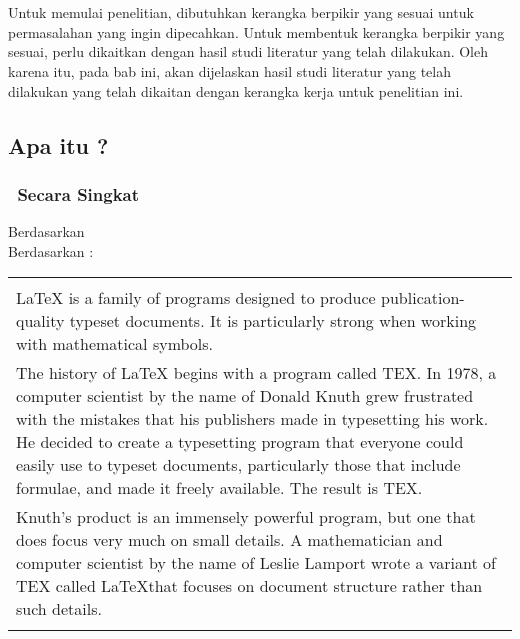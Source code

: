 \chapter{\babDua}
\label{bab:2}
Untuk memulai penelitian, dibutuhkan kerangka berpikir yang sesuai untuk permasalahan yang ingin dipecahkan.
Untuk membentuk kerangka berpikir yang sesuai, perlu dikaitkan dengan hasil studi literatur yang telah dilakukan.
Oleh karena itu, pada bab ini, akan dijelaskan hasil studi literatur yang telah dilakukan yang telah dikaitan dengan kerangka kerja untuk penelitian ini.


\section{Apa itu \latex?}
\label{sec:latex}

\subsection{\latex~Secara Singkat}
\label{sec:latexBrief}
Berdasarkan \citep{latex:intro} \\
Berdasarkan \cite{latex:intro}: \\
\begin{tabular}{| p{13cm} |}
	\hline
	\\
	LaTeX is a family of programs designed to produce publication-quality typeset documents.
	It is particularly strong when working with mathematical symbols. \\
	The history of LaTeX begins with a program called TEX.
	In 1978, a computer scientist by the name of Donald Knuth grew frustrated with the mistakes that his publishers made in typesetting his work.
	He decided to create a typesetting program that everyone could easily use to typeset documents, particularly those that include formulae, and made it freely available.
	The result is TEX. \\
	Knuth's product is an immensely powerful program, but one that does focus very much on small details.
	A mathematician and computer scientist by the name of Leslie Lamport wrote a variant of TEX called \LaTeX that focuses on document structure rather than such details. \\
	\\
	\hline
\end{tabular}

